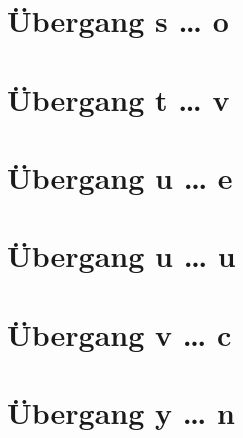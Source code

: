 \documentclass[a4paper,landscape]{article}
\begin{document}
\hspace*{-1ex}
\newpage

\section{Übergang s … o }

\hspace*{-1ex}
\newpage

\section{Übergang t … v }

\hspace*{-1ex}
\newpage

\section{Übergang u … e }

\hspace*{-1ex}
\newpage

\section{Übergang u … u }

\hspace*{-1ex}
\newpage

\section{Übergang v … c }

\hspace*{-1ex}
\newpage

\section{Übergang y … n }

\hspace*{-1ex}
\newpage
\end{document}
